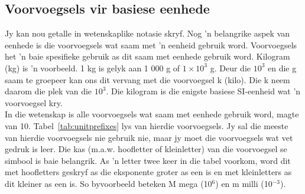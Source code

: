 \subsection*{Voorvoegsels vir basiese eenhede}
            \nopagebreak
Jy kan nou getalle in wetenskaplike notasie skryf. Nog  'n belangrike aspek van eenhede is die voorvoegsels wat saam met  'n eenheid gebruik word. Voorvoegsels het  'n baie spesifieke gebruik as dit saam met eenhede gebruik word. Kilogram (kg) is  'n voorbeeld. 1 kg is gelyk aan 1 000 g of $1\ensuremath{\times}{10}^{3}$ g. Deur die ${10}^{3}$ en die g saam te groepeer kan ons dit vervang met die voorvoegsel k (kilo). Die k neem daarom die plek van die ${10}^{3}$. Die kilogram is die enigste basiese SI-eenheid wat  'n voorvoegsel kry. \\
In die wetenskap is alle voorvoegsels wat saam met eenhede gebruik word, magte van 10. Tabel~\ref{tab:unitprefixes} lys van hierdie voorvoegsels. Jy sal die meeste van hierdie voorvoegsels nie gebruik nie, maar jy moet die voorvoegsels wat vet gedruk is leer. Die kas (m.a.w. hoofletter of kleinletter) van die voorvoegsel se simbool is baie belangrik. As  'n letter twee keer in die tabel voorkom, word dit met hoofletters geskryf as die eksponente groter as een is en met kleinletters as dit kleiner as een is. So byvoorbeeld beteken M mega (10${}^{6}$) en m milli (10${}^{-3}$).


